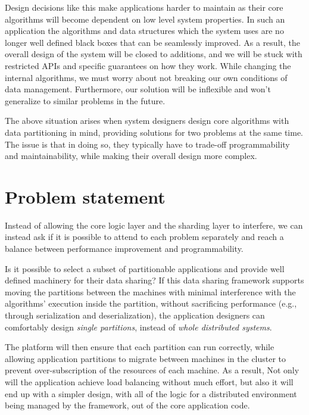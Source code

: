 Design decisions like this make applications harder to maintain as their
core algorithms will become dependent on low level system properties.
In such an application the algorithms and data structures which the system uses
are no longer well defined black boxes that can be seamlessly improved. As a
result, the overall design of the system will be closed to additions, and we
will be stuck with restricted APIs and specific guarantees on how they work.
While changing the internal algorithms, we must worry about not breaking our own
conditions of data management. Furthermore, our solution will be inflexible and
won't generalize to similar problems in the future.

The above situation arises when system designers design
core algorithms with data partitioning in mind, providing solutions for two
problems at the same time. The issue is that in doing so, they typically have to
trade-off programmability and maintainability, while making their overall design
more complex.

\section{Problem statement}
Instead of allowing the core logic layer and the sharding layer to interfere,
we can instead ask if it is possible to attend to each problem separately and
reach a balance between performance improvement and programmability.

Is it possible to select a subset of partitionable applications
and provide well defined machinery for their data sharing? If this data sharing
framework supports moving the partitions between the machines with minimal
interference with the algorithms' execution inside the partition, without
sacrificing performance (e.g., through serialization and deserialization), the
application designers can comfortably design \emph{single partitions}, instead
of \emph{whole distributed systems}.

The platform will then ensure that each partition can run correctly, while
allowing application partitions to migrate between machines in the cluster
to prevent over-subscription of the resources of each machine. As a result,
Not only will the application achieve load balancing without
much effort,
but also it will end up with a simpler design, with all
of the logic for a distributed environment being managed by the framework,
out of the core application code.

